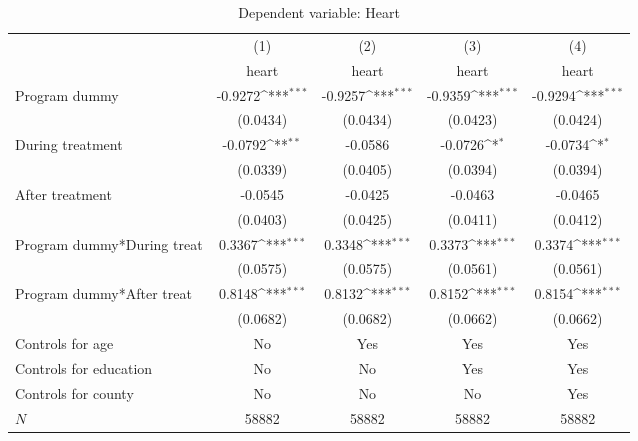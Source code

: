 \begin{table}[htbp]\centering
\def\sym#1{\ifmmode^{#1}\else\(^{#1}\)\fi}
\caption{Dependent variable: Heart}
\begin{tabular}{l*{4}{c}}
\hline\hline
            &\multicolumn{1}{c}{(1)}&\multicolumn{1}{c}{(2)}&\multicolumn{1}{c}{(3)}&\multicolumn{1}{c}{(4)}\\
            &\multicolumn{1}{c}{heart}&\multicolumn{1}{c}{heart}&\multicolumn{1}{c}{heart}&\multicolumn{1}{c}{heart}\\
\hline
Program dummy&     -0.9272\sym{***}&     -0.9257\sym{***}&     -0.9359\sym{***}&     -0.9294\sym{***}\\
            &    (0.0434)         &    (0.0434)         &    (0.0423)         &    (0.0424)         \\
[1em]
During treatment&     -0.0792\sym{**} &     -0.0586         &     -0.0726\sym{*}  &     -0.0734\sym{*}  \\
            &    (0.0339)         &    (0.0405)         &    (0.0394)         &    (0.0394)         \\
[1em]
After treatment&     -0.0545         &     -0.0425         &     -0.0463         &     -0.0465         \\
            &    (0.0403)         &    (0.0425)         &    (0.0411)         &    (0.0412)         \\
[1em]
Program dummy*During treat&      0.3367\sym{***}&      0.3348\sym{***}&      0.3373\sym{***}&      0.3374\sym{***}\\
            &    (0.0575)         &    (0.0575)         &    (0.0561)         &    (0.0561)         \\
[1em]
Program dummy*After treat&      0.8148\sym{***}&      0.8132\sym{***}&      0.8152\sym{***}&      0.8154\sym{***}\\
            &    (0.0682)         &    (0.0682)         &    (0.0662)         &    (0.0662)         \\
[1em]
Controls for age &          No         &         Yes         &         Yes         &         Yes         \\
[1em]
Controls for education &          No         &          No         &         Yes         &         Yes         \\
[1em]
Controls for county &          No         &          No         &          No         &         Yes         \\
\hline
\(N\)       &       58882         &       58882         &       58882         &       58882         \\

\end{tabular}
\end{table}
